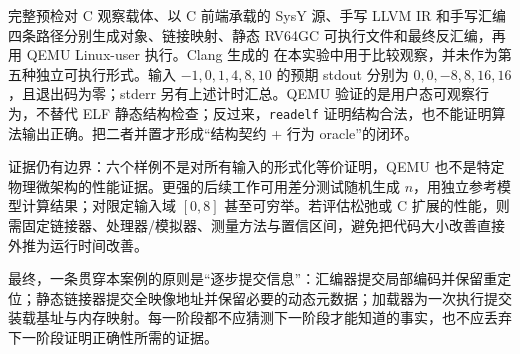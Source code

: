 完整预检对 C 观察载体、以 C 前端承载的 SysY 源、手写 LLVM IR 和手写汇编四条路径分别生成对象、链接映射、静态 RV64GC 可执行文件和最终反汇编，再用 QEMU Linux-user 执行。Clang 生成的  在本实验中用于比较观察，并未作为第五种独立可执行形式。输入 \(-1,0,1,4,8,10\) 的预期 stdout 分别为 \(0,0,-8,8,16,16\)，且退出码为零；stderr 另有上述计时汇总。QEMU 验证的是用户态可观察行为，不替代 ELF 静态结构检查；反过来，\texttt{readelf} 证明结构合法，也不能证明算法输出正确。把二者并置才形成“结构契约 + 行为 oracle”的闭环。

证据仍有边界：六个样例不是对所有输入的形式化等价证明，QEMU 也不是特定物理微架构的性能证据。更强的后续工作可用差分测试随机生成 \(n\)，用独立参考模型计算结果；对限定输入域 \([0,8]\) 甚至可穷举。若评估松弛或 C 扩展的性能，则需固定链接器、处理器/模拟器、测量方法与置信区间，避免把代码大小改善直接外推为运行时间改善。

最终，一条贯穿本案例的原则是“逐步提交信息”：汇编器提交局部编码并保留重定位；静态链接器提交全映像地址并保留必要的动态元数据；加载器为一次执行提交装载基址与内存映射。每一阶段都不应猜测下一阶段才能知道的事实，也不应丢弃下一阶段证明正确性所需的证据。
